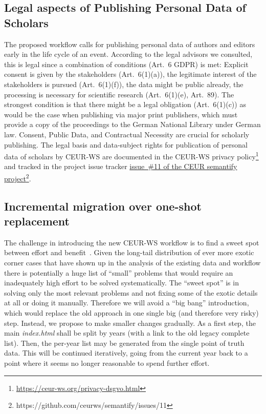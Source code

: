 \documentclass[runningheads]{llncs}
\newcommand{\tquote}[1]{``#1''}
\newcommand{\footnotelink}[2]{\href{#1}{#2}\footnote{#1}}
\begin{document}
\subsection{Legal aspects of Publishing Personal Data of Scholars}
\label{sec:legal}
The proposed workflow calls for publishing personal data of authors
and editors early in the life cycle of an event. According to the legal advisors we consulted, this is legal since a combination of conditions (Art.\ 6 GDPR) is met:
Explicit consent is given by the stakeholders (Art.\ 6(1)(a)), the legitimate interest of the
stakeholders is pursued (Art.\ 6(1)(f)), the data might be public already, the processing is necessary for scientific research (Art.\ 6(1)(e), Art.\ 89). The strongest condition is that there might be a legal obligation (Art.\ 6(1)(c)) as would be the case when publishing via major print publishers, which must
provide a copy of the proceedings to the German National Library under German law.
Consent, Public Data, and Contractual Necessity are crucial for
scholarly publishing.
The legal basis and data-subject rights for publication of personal data of scholars by CEUR-WS are documented in the CEUR-WS privacy policy\footnote{\url{https://ceur-ws.org/privacy-dsgvo.html}} and tracked in the project issue tracker \footnotelink{https://github.com/ceurws/semantify/issues/11}{issue~\#11 of the CEUR semantify project}.
\subsection{Incremental migration over one-shot replacement}
The challenge in introducing the new CEUR-WS workflow is to find a sweet spot between effort and benefit~\cite{Pohl2015-vj}. Given the long-tail distribution of ever more exotic corner cases that have shown up in the analysis of the existing data and workflow there is potentially a huge list of \tquote{small} problems that would require an inadequately high effort to be solved systematically. The \tquote{sweet spot} is in solving only the most relevant problems and not fixing some of the exotic details at all or doing it manually. Therefore we will avoid a \tquote{big bang} introduction, which would replace the old approach in one single big (and therefore very risky) step.
Instead, we propose to make smaller changes gradually. As a first step, the main \textit{index.html} shall be split by years (with a link to the old legacy complete list). Then, the per-year list may be generated from the single point of truth data. This will be continued iteratively, going from the current year back to a point where it seems no longer reasonable to spend further effort.
\end{document}
